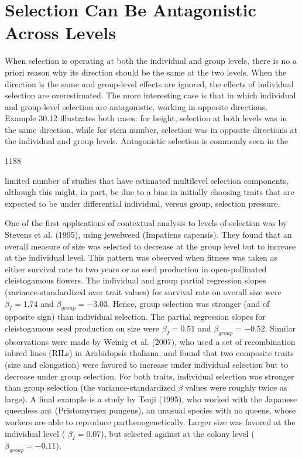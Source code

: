\documentclass{article}
\begin{document}
\section{Selection Can Be Antagonistic Across Levels}
When selection is operating at both the individual and group levels, there is no a priori reason why its direction should be the same at the two levels. When the direction is the same and group-level effects are ignored, the effects of individual selection are overestimated. The more interesting case is that in which individual and group-level selection are antagonistic, working in opposite directions. Example 30.12 illustrates both cases: for height, selection at both levels was in the same direction, while for stem number, selection was in opposite directions at the individual and group levels. Antagonistic selection is commonly seen in the

1188

limited number of studies that have estimated multilevel selection components, although this might, in part, be due to a bias in initially choosing traits that are expected to be under differential individual, versus group, selection pressure.

One of the first applications of contextual analysis to levels-of-selection was by Stevens et al. (1995), using jewelweed (Impatiens capensis). They found that an overall measure of size was selected to decrease at the group level but to increase at the individual level. This pattern was observed when fitness was taken as either survival rate to two years or as seed production in open-pollinated cleistogamous flowers. The individual and group partial regression slopes (variance-standardized over trait values) for survival rate on overall size were  $ \beta_{I}=1.74 $ and  $ \beta_{group}=-3.03 $. Hence, group selection was stronger (and of opposite sign) than individual selection. The partial regression slopes for cleistogamous seed production on size were  $ \beta_{I}=0.51 $ and  $ \beta_{group}=-0.52 $. Similar observations were made by Weinig et al. (2007), who used a set of recombination inbred lines (RILs) in Arabidopsis thaliana, and found that two composite traits (size and elongation) were favored to increase under individual selection but to decrease under group selection. For both traits, individual selection was stronger than group selection (the variance-standardized  $ \beta $ values were roughly twice as large). A final example is a study by Tsuji (1995), who worked with the Japanese queenless ant (Pristomyrnex pungens), an unusual species with no queens, whose workers are able to reproduce parthenogenetically. Larger size was favored at the individual level ( $ \beta_{I}=0.07 $), but selected against at the colony level ( $ \beta_{group}=-0.11 $).
\end{document}
